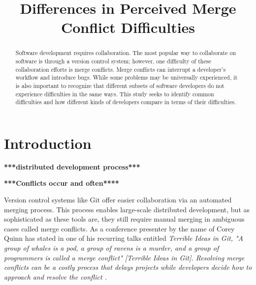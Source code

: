 \documentclass[conference]{IEEEtran}
\begin{document}
\title{Differences in Perceived Merge Conflict Difficulties}

\author{
}

\maketitle

\begin{abstract}
Software development requires collaboration. The most popular way to collaborate on software is through a version control system; however, one difficulty of these collaboration efforts is merge conflicts. Merge conflicts can interrupt a developer's workflow and introduce bugs. While some problems may be universally experienced, it is also important to recognize that different subsets of software developers do not experience difficulties in the same ways. This study seeks to identify common difficulties and how different kinds of developers compare in terms of their difficulties.
\end{abstract}

\IEEEpeerreviewmaketitle



\section{Introduction}
\textbf{***distributed development process***}

\textbf{***Conflicts occur and often****}

Version control systems like Git offer easier collaboration via an automated merging process. This process enables large-scale distributed development, but as sophisticated as these tools are, they still require manual merging in ambiguous cases called merge conflicts. As a conference presenter by the name of Corey Quinn has stated in one of his recurring talks entitled \it{Terrible Ideas in Git}, "A group of whales is a pod, a group of ravens is a murder, and a group of programmers is called a merge conflict" [Terrible Ideas in Git]. Resolving merge conflicts can be a costly process that delays projects while developers decide how to approach and resolve the conflict \cite{cassandra}. 
\end{document}
